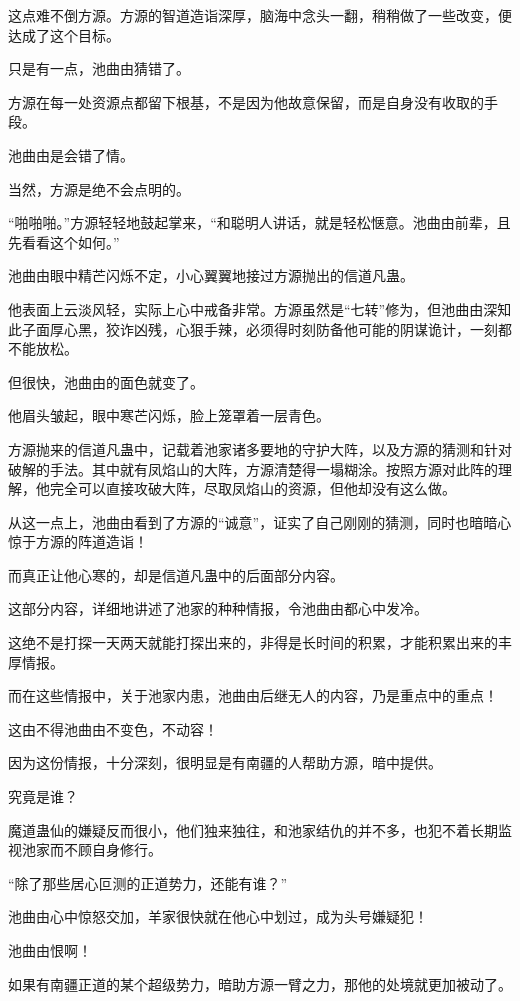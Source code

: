 \begin{this_body}
这点难不倒方源。方源的智道造诣深厚，脑海中念头一翻，稍稍做了一些改变，便达成了这个目标。

只是有一点，池曲由猜错了。

方源在每一处资源点都留下根基，不是因为他故意保留，而是自身没有收取的手段。

池曲由是会错了情。

当然，方源是绝不会点明的。

“啪啪啪。”方源轻轻地鼓起掌来，“和聪明人讲话，就是轻松惬意。池曲由前辈，且先看看这个如何。”

池曲由眼中精芒闪烁不定，小心翼翼地接过方源抛出的信道凡蛊。

他表面上云淡风轻，实际上心中戒备非常。方源虽然是“七转”修为，但池曲由深知此子面厚心黑，狡诈凶残，心狠手辣，必须得时刻防备他可能的阴谋诡计，一刻都不能放松。

但很快，池曲由的面色就变了。

他眉头皱起，眼中寒芒闪烁，脸上笼罩着一层青色。

方源抛来的信道凡蛊中，记载着池家诸多要地的守护大阵，以及方源的猜测和针对破解的手法。其中就有凤焰山的大阵，方源清楚得一塌糊涂。按照方源对此阵的理解，他完全可以直接攻破大阵，尽取凤焰山的资源，但他却没有这么做。

从这一点上，池曲由看到了方源的“诚意”，证实了自己刚刚的猜测，同时也暗暗心惊于方源的阵道造诣！

而真正让他心寒的，却是信道凡蛊中的后面部分内容。

这部分内容，详细地讲述了池家的种种情报，令池曲由都心中发冷。

这绝不是打探一天两天就能打探出来的，非得是长时间的积累，才能积累出来的丰厚情报。

而在这些情报中，关于池家内患，池曲由后继无人的内容，乃是重点中的重点！

这由不得池曲由不变色，不动容！

因为这份情报，十分深刻，很明显是有南疆的人帮助方源，暗中提供。

究竟是谁？

魔道蛊仙的嫌疑反而很小，他们独来独往，和池家结仇的并不多，也犯不着长期监视池家而不顾自身修行。

“除了那些居心叵测的正道势力，还能有谁？”

池曲由心中惊怒交加，羊家很快就在他心中划过，成为头号嫌疑犯！

池曲由恨啊！

如果有南疆正道的某个超级势力，暗助方源一臂之力，那他的处境就更加被动了。


\end{this_body}
